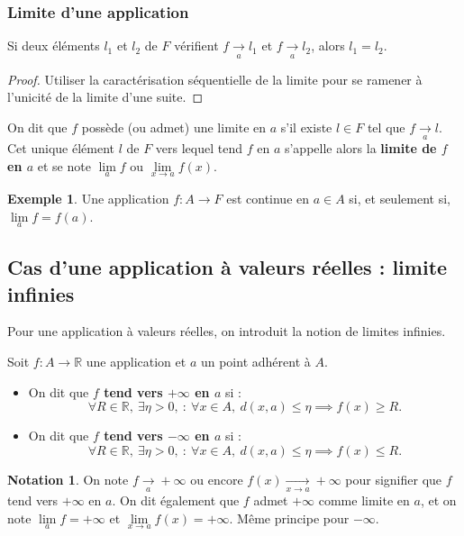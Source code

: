 \documentclass[french]{article}
\newcommand{\R}{\mathbb{R}}
\theoremstyle{plain}
\theoremstyle{definition}
\newtheorem*{ex}{Exemple}
\newtheorem*{notation}{Notation}
\theoremstyle{remark}
\begin{document}
\subsubsection*{Limite d'une application}

\begin{prop}
	Si deux éléments $l_1$ et $l_2$ de $F$ vérifient $f\xrightarrow[a]{}l_1$ et $f\xrightarrow[a]{}l_2$, alors $l_1=l_2$.
\end{prop}
\begin{proof}
	Utiliser la caractérisation séquentielle de la limite pour se ramener à l'unicité de la limite d'une suite.
\end{proof}

\begin{dfn}
	On dit que $f$ possède (ou admet) une limite en $a$ s'il existe $l\in F$ tel que $f\xrightarrow[a]{}l$. Cet unique élément $l$ de $F$ vers lequel tend $f$ en $a$ s'appelle alors la \textbf{limite de $f$ en $a$} et se note $\underset{a}{\lim}f$ ou $\underset{x\to a}{\lim}f(x)$.
\end{dfn}

\begin{ex}
	Une application $f:A\to F$ est continue en $a\in A$ si, et seulement si, $\underset{a}{\lim}f=f(a)$.
\end{ex}

\subsection{Cas d'une application à valeurs réelles : limite infinies}

Pour une application à valeurs réelles, on introduit la notion de limites infinies.

\begin{dfn}
	Soit $f:A\to\R$ une application et $a$ un point adhérent à $A$.
	\begin{itemize}
		\item On dit que \textbf{$f$ tend vers $+\infty$ en $a$} si :
		$$\forall R\in\R,\ \exists\eta>0,\ :\ \forall x\in A,\ d(x,a)\leqslant\eta\implies f(x)\geqslant R.$$
		\item On dit que \textbf{$f$ tend vers $-\infty$ en $a$} si :
		$$\forall R\in\R,\ \exists\eta>0,\ :\ \forall x\in A,\ d(x,a)\leqslant\eta\implies f(x)\leqslant R.$$
	\end{itemize}
\end{dfn}

\begin{notation}
	On note $f\xrightarrow[a]{}+\infty$ ou encore $f(x)\xrightarrow[x\to a]{}+\infty$ pour signifier que $f$ tend vers $+\infty$ en $a$. On dit également que $f$ admet $+\infty$ comme limite en $a$, et on note $\underset{a}{\lim}f=+\infty$ et $\underset{x\to a}{\lim}f(x)=+\infty$. Même principe pour $-\infty$.
\end{notation}
\end{document}
